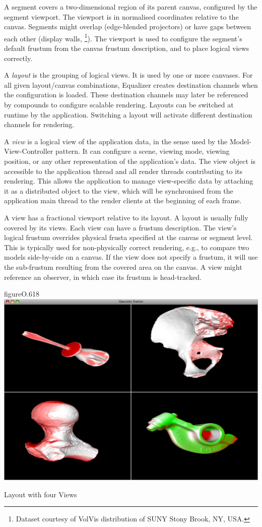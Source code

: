 A segment covers a two-dimensional region of its parent canvas, configured by
the segment viewport. The viewport is in normalised coordinates relative to the
canvas. Segments might overlap (edge-blended projectors) or have gaps between
each other (display walls, \footnote{Dataset courtesy of VolVis
distribution of SUNY Stony Brook, NY, USA.}). The viewport is used to configure
the segment's default frustum from the canvas frustum description, and to place
logical views correctly.

A {\em layout} is the grouping of logical views. It is used by one or more
canvases. For all given layout/canvas combinations, Equalizer creates
destination channels when the configuration is loaded. These destination
channels may later be referenced by compounds to configure scalable rendering.
Layouts can be switched at runtime by the application. Switching a layout will
activate different destination channels for rendering.

A {\em view} is a logical view of the application data, in the sense used by
the Model-View-Controller pattern. It can configure a scene, viewing mode,
viewing position, or any other representation of the application's data. The
view object is accessible to the application thread and all render threads
contributing to its rendering. This allows the application to manage
view-specific data by attaching it as a distributed object to the view, which
will be synchronised from the application main thread to the render clients at the beginning of each frame.

A view has a fractional viewport relative to its layout. A layout is usually
fully covered by its views. Each view can have a frustum description. The
view's logical frustum overrides physical frusta specified at the canvas or
segment level. This is typically used for non-physically correct rendering,
e.g., to compare two models side-by-side on a canvas. If the view does not
specify a frustum, it will use the sub-frustum resulting from the covered area
on the canvas. A view might reference an observer, in which case its frustum is
head-tracked.

\begin{wrapfloat}{figure}{O}{.618\textwidth}
 \includegraphics[width=.618\textwidth]{images/layout.png}
 {\caption{\label{fLayout}Layout with four Views}}
\end{wrapfloat}

